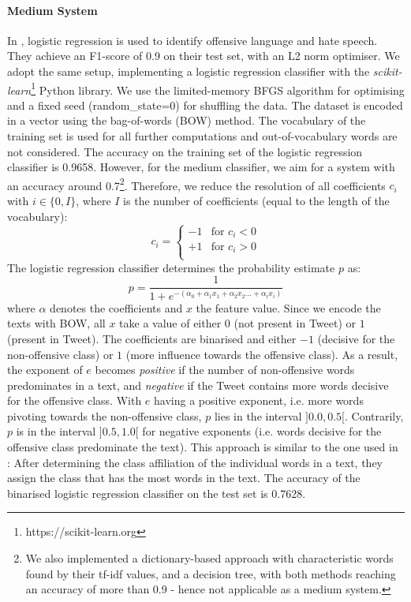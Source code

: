 \paragraph{Medium System}
In \cite{davidson2017automated}, logistic regression is used to identify offensive language and hate speech. They achieve an F1-score of 0.9 on their test set, with an L2 norm optimiser. We adopt the same setup, implementing a logistic regression classifier with the \textit{scikit-learn}\footnote{https://scikit-learn.org} Python library. We use the limited-memory BFGS algorithm for optimising and a fixed seed (random\_state=0) for shuffling the data. The dataset is encoded in a vector using the bag-of-words (BOW) method. The vocabulary of the training set is used for all further computations and out-of-vocabulary words are not considered. The accuracy on the training set of the logistic regression classifier is 0.9658. However, for the medium classifier, we aim for a system with an accuracy around 0.7\setcounter{footnote}{0}\renewcommand*{\thefootnote}{\fnsymbol{footnote}}\footnote{We also implemented a dictionary-based approach with characteristic words found by their tf-idf values, and a decision tree, with both methods reaching an accuracy of more than 0.9 - hence not applicable as a medium system.}\renewcommand*{\thefootnote}{\arabic{footnote}}\setcounter{footnote}{18}. Therefore, we reduce the resolution of all coefficients $c_i$ with $i \in \{0,I\}$, where $I$ is the number of coefficients (equal to the length of the vocabulary): 
\[c_i =
\begin{cases}
	-1 & \text{for   } c_i<0 \\
	+1 & \text{for   } c_i>0 \\
\end{cases}\]
The logistic regression classifier determines the probability estimate $p$ as:
\[
p=\frac{1}{1+e^{-(\alpha_0+\alpha_1x_1+\alpha_2x_2...+\alpha_ix_i)}}
\]
where $\alpha$ denotes the coefficients and $x$ the feature value. Since we encode the texts with BOW, all $x$ take a value of either $0$ (not present in Tweet) or $1$ (present in Tweet). The coefficients are binarised and either $-1$ (decisive for the non-offensive class) or $1$ (more influence towards the offensive class). As a result, the exponent of $e$ becomes \textit{positive} if the number of non-offensive words predominates in a text, and \textit{negative} if the Tweet contains more words decisive for the offensive class. With $e$ having a positive exponent, i.e. more words pivoting towards the non-offensive class, $p$ lies in the interval $]0.0,0.5[$. Contrarily, $p$ is in the interval $]0.5,1.0[$ for negative exponents (i.e. words decisive for the offensive class predominate the text). This approach is similar to the one used in \cite{klenner2018offensive}: After determining the class affiliation of the individual words in a text, they assign the class that has the most words in the text. The accuracy of the binarised logistic regression classifier on the test set is 0.7628.

